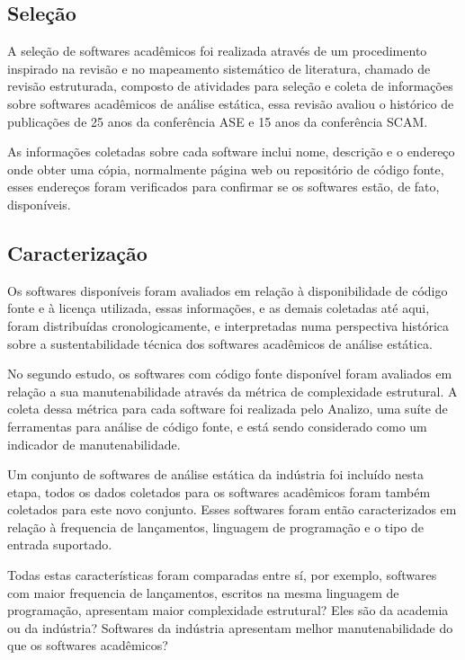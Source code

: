 \subsection{Seleção}

A seleção de softwares acadêmicos foi realizada através de um procedimento
inspirado na revisão e no mapeamento sistemático de literatura, chamado de
revisão estruturada, composto de atividades para seleção e coleta de
informações sobre softwares acadêmicos de análise estática, essa revisão
avaliou o histórico de publicações de 25 anos da conferência ASE e 15 anos da
conferência SCAM.

As informações coletadas sobre cada software inclui nome, descrição e o
endereço onde obter uma cópia, normalmente página web ou repositório de código
fonte, esses endereços foram verificados para confirmar se os softwares estão,
de fato, disponíveis.

\subsection{Caracterização}
Os softwares disponíveis foram avaliados em relação à disponibilidade de código
fonte e à licença utilizada, essas informações, e as demais coletadas até aqui,
foram distribuídas cronologicamente, e interpretadas numa perspectiva histórica
sobre a sustentabilidade técnica dos softwares acadêmicos de análise estática.

No segundo estudo, os softwares com código fonte disponível foram avaliados em
relação a sua manutenabilidade através da métrica de complexidade estrutural. A
coleta dessa métrica para cada software foi realizada pelo Analizo, uma suíte
de ferramentas para análise de código fonte, e está sendo considerado como um
indicador de manutenabilidade.

Um conjunto de softwares de análise estática da indústria foi incluído nesta
etapa, todos os dados coletados para os softwares acadêmicos foram também
coletados para este novo conjunto. Esses softwares foram então caracterizados em
relação à frequencia de lançamentos, linguagem de programação e o tipo de
entrada suportado.

Todas estas características foram comparadas entre sí, por exemplo, softwares
com maior frequencia de lançamentos, escritos na mesma linguagem de
programação, apresentam maior complexidade estrutural? Eles são da academia ou
da indústria? Softwares da indústria apresentam melhor manutenabilidade do que
os softwares acadêmicos?

